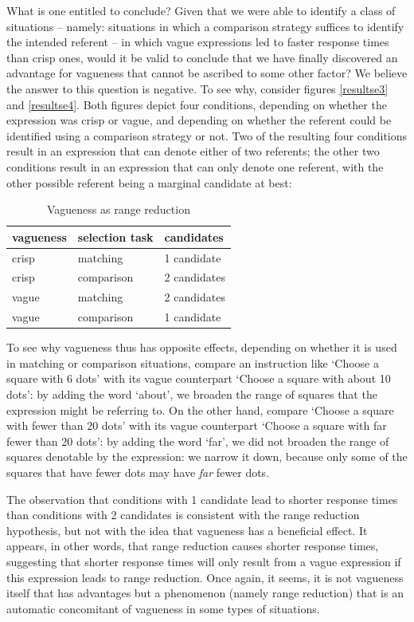 \documentclass[
a4paper 
, doc
, longtable
]{apa6}
\begin{document}
What is one entitled to conclude? Given that we were able to identify a class of situations -- namely: situations in which a comparison strategy suffices to identify the intended referent -- in which vague expressions led to faster response times than crisp ones, would it be valid to conclude that we have finally discovered an advantage for vagueness that cannot be ascribed to some other factor? We believe the answer to this question is negative. To see why, consider figures \ref{resultse3} and \ref{resultse4}. Both figures depict four conditions, depending on whether the expression was crisp or vague, and depending on whether the referent could be identified using a comparison strategy or not. Two of the resulting four conditions result in an expression that can denote either of two referents; the other two conditions result in an expression that can only denote one referent, with the other possible referent being a marginal candidate at best:

\begin{table}[htbp]
\caption{Vagueness as range reduction}
\begin{center}
\begin{tabular}{lll}
\hline
vagueness & selection task & candidates\\
\hline
crisp & matching & 1 candidate\\
crisp & comparison & 2 candidates\\
vague & matching & 2 candidates\\
vague & comparison & 1 candidate\\
\hline
\end{tabular}
\end{center}
\label{default}
\end{table}

To see why vagueness thus has opposite effects, depending on whether it is used in matching or comparison situations, compare an instruction like `Choose a square with 6 dots' with its vague counterpart `Choose a square with about 10 dots': by adding the word `about', we broaden the range of squares that the expression might be referring to. On the other hand, compare `Choose a square with fewer than 20 dots' with its vague counterpart `Choose a square with far fewer than 20 dots': by adding the word `far', we did not broaden the range of squares denotable by the expression: we narrow it down, because only some of the squares that have fewer dots may have {\em far} fewer dots.

The observation that conditions with 1 candidate lead to shorter response times than conditions with 2 candidates is consistent with the range reduction hypothesis, but not with the idea that vagueness has a beneficial effect. It appears, in other words, that range reduction causes shorter response times, suggesting that shorter response times will only result from a vague expression if this expression leads to range reduction. Once again, it seems, it is not vagueness itself that has advantages but a phenomenon (namely range reduction) that is an automatic concomitant of vagueness in some types of situations.
\end{document}
